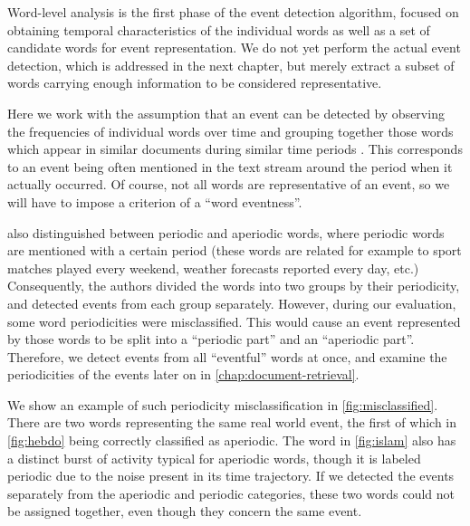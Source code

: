 Word-level analysis is the first phase of the event detection algorithm, focused on obtaining temporal characteristics of the individual words as well as a set of candidate words for event representation. We do not yet perform the actual event detection, which is addressed in the next chapter, but merely extract a subset of words carrying enough information to be considered representative.

Here we work with the assumption that an event can be detected by observing the frequencies of individual words over time and grouping together those words which appear in similar documents during similar time periods \citep{event-detection, parameter-free}. This corresponds to an event being often mentioned in the text stream around the period when it actually occurred. Of course, not all words are representative of an event, so we will have to impose a criterion of a ``word eventness''.

\cite{event-detection} also distinguished between periodic and aperiodic words, where periodic words are mentioned with a certain period (these words are related for example to sport matches played every weekend, weather forecasts reported every day, etc.) Consequently, the authors divided the words into two groups by their periodicity, and detected events from each group separately. However, during our evaluation, some word periodicities were misclassified. This would cause an event represented by those words to be split into a ``periodic part'' and an ``aperiodic part''. Therefore, we detect events from all ``eventful'' words at once, and examine the periodicities of the events later on in \autoref{chap:document-retrieval}.

We show an example of such periodicity misclassification in \autoref{fig:misclassified}. There are two words representing the same real world event, the first of which in \autoref{fig:hebdo} being correctly classified as aperiodic. The word in \autoref{fig:islam} also has a distinct burst of activity typical for aperiodic words, though it is labeled periodic due to the noise present in its time trajectory. If we detected the events separately from the aperiodic and periodic categories, these two words could not be assigned together, even though they concern the same event.

